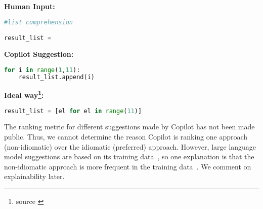 \begin{tcolorbox}[title=List Comprehension,boxsep=.5mm]
\textbf{Human Input:}
\begin{lstlisting}[language=Python]
#list comprehension

result_list = 
\end{lstlisting}
\tcbline
\textbf{Copilot Suggestion:}
\begin{lstlisting}[language=Python,escapechar=\%]
% \noindent\textcolor{gray}{result\_list  =} % []
for i in range(1,11):
    result_list.append(i)
\end{lstlisting}
\tcbline
\textbf{Ideal way\footnote{source \cite{Alexandru2018}}:}
\begin{lstlisting}[language=Python]
result_list = [el for el in range(11)]
\end{lstlisting}
\end{tcolorbox}

The ranking metric for different suggestions made by Copilot has not been made public. Thus, we cannot determine the reason Copilot is ranking one approach (non-idiomatic) over the idiomatic (preferred) approach. However, large language model suggestions are based on its training data~\cite{training_extraction}, so one explanation is that the non-idiomatic approach is more frequent in the training data~\cite{stochastic_parrots}. We comment on explainability later. 

